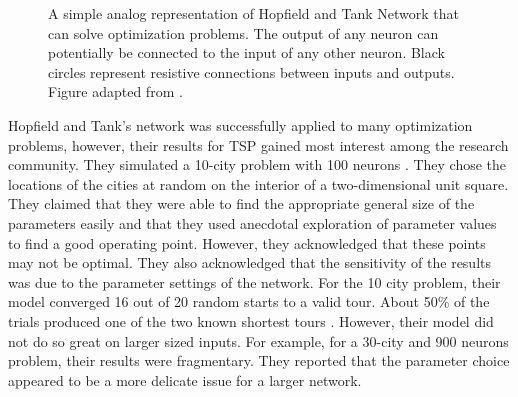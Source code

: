 \documentclass{article}
\begin{document}
\begin{figure}
    \caption{A simple analog representation of Hopfield and Tank Network that can solve optimization problems. The output of any neuron can potentially be connected to the input of any other neuron. Black circles represent resistive connections between inputs and outputs. Figure adapted from \cite{hopfield1985neural}.}
    \label{fig:hopfield-network}
\end{figure}

Hopfield and Tank's network was successfully applied to many optimization problems, however, their results for TSP gained most interest among the research community. They simulated a 10-city problem with 100 neurons \cite{hopfield1982neural}. They chose the locations of the cities at random on the interior of a two-dimensional unit square. They claimed that they were able to find the appropriate general size of the parameters easily and that they used anecdotal exploration of parameter values to find a good operating point. However, they acknowledged that these points may not be optimal. They also acknowledged that the sensitivity of the results was due to the parameter settings of the network. For the 10 city problem, their model converged 16 out of 20 random starts to a valid tour. About 50\% of the trials produced one of the two known shortest tours \cite{hopfield1985neural, smith1999neural}. However, their model did not do so great on larger sized inputs. For example, for a 30-city and 900 neurons problem, their results were fragmentary. They reported that the parameter choice appeared to be a more delicate issue for a larger network. 
\end{document}
